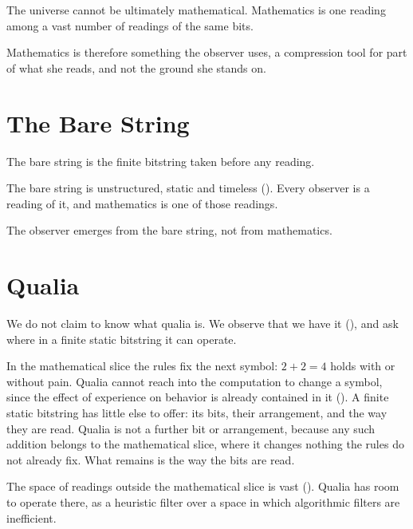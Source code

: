 \documentclass[11pt]{book}
\begin{document}
\begin{deduction}\label{ded:math-slice}
  The universe cannot be ultimately mathematical. Mathematics is one
  reading among a vast number of readings of the same bits.
\end{deduction}

Mathematics is therefore something the observer uses, a compression tool
for part of what she reads, and not the ground she stands on.


\section{The Bare String}
\label{sec:bare}

\begin{definition}\label{df:bare-string}
  The bare string is the finite bitstring taken before any reading.
\end{definition}

The bare string is unstructured, static and timeless ().
Every observer is a reading of it, and mathematics is one of those
readings.

\begin{deduction}\label{ded:bare}
  The observer emerges from the bare string, not from mathematics.
\end{deduction}


\section{Qualia}
\label{sec:qualia}

We do not claim to know what qualia is. We observe that we have it
(), and ask where in a finite static bitstring it can
operate.

In the mathematical slice the rules fix the next symbol: $2 + 2 = 4$ holds
with or without pain. Qualia cannot reach into the computation to change a
symbol, since the effect of experience on behavior is already contained in
it (). A finite static bitstring has little else
to offer: its bits, their arrangement, and the way they are read. Qualia is
not a further bit or arrangement, because any such addition belongs to the
mathematical slice, where it changes nothing the rules do not already fix.
What remains is the way the bits are read.

The space of readings outside the mathematical slice is vast
(). Qualia has room to operate there, as a heuristic
filter over a space in which algorithmic filters are inefficient.
\end{document}
